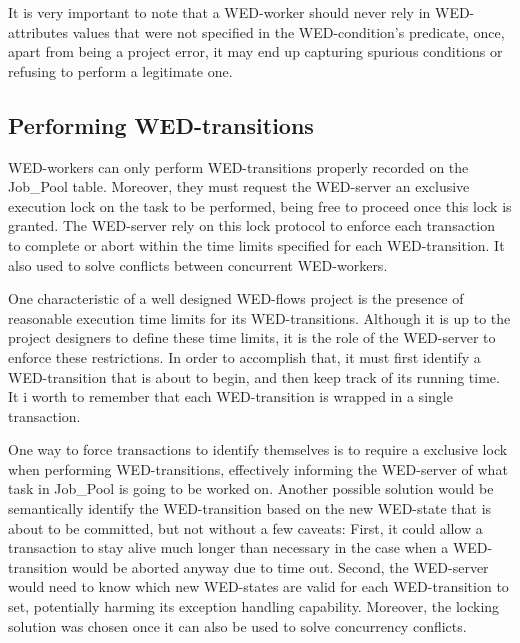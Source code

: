 \documentclass[12pt]{article}
\begin{document}
\par It is very important to note that a WED-worker should never rely in WED-attributes values that were not specified in
the WED-condition's predicate, once, apart from being a project error, it may end up capturing spurious conditions or refusing
to perform a legitimate one.

\subsection{Performing WED-transitions}

WED-workers can only perform WED-transitions properly recorded on the Job\_Pool table. Moreover, they must request the WED-server
an exclusive execution lock on the task to be performed, being free to proceed once this lock is granted. The WED-server rely
on this lock protocol to enforce each transaction to complete or abort within the time limits specified for each WED-transition.
It also used to solve conflicts between concurrent WED-workers. 

\par One characteristic of a well designed WED-flows project is the presence of reasonable execution time limits for its WED-transitions.
Although it is up to the project designers to define these time limits, it is the role of the WED-server to enforce these restrictions.
In order to accomplish that, it must first identify a WED-transition that is about to begin, and then keep track of its running time.
It i worth to remember that each WED-transition is wrapped in a single transaction.

\par One way to force transactions to identify themselves is to require a exclusive lock when performing WED-transitions,
effectively informing the WED-server of what task in Job\_Pool is going to be worked on. Another possible solution would
be semantically identify the WED-transition based on the new WED-state that is about to be committed, but not without a 
few caveats: First, it could allow a transaction to stay alive much longer than necessary in the case when a WED-transition
would be aborted anyway due to time out. Second, the WED-server would need to know which new WED-states are valid for each
WED-transition to set, potentially harming its exception handling capability. Moreover, the locking solution was chosen 
once it can also be used to solve concurrency conflicts.    
\end{document}
